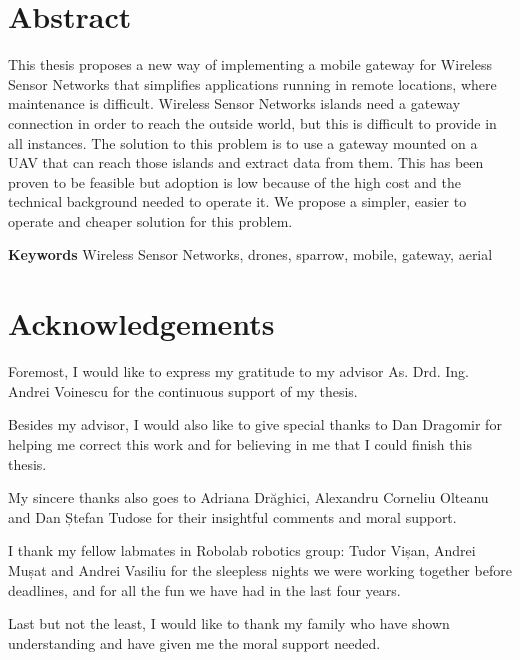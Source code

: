 \chapter*{Abstract}

This thesis proposes a new way of implementing a mobile gateway for Wireless Sensor Networks that simplifies applications running in remote locations, where maintenance is difficult. Wireless Sensor Networks islands need a gateway connection in order to reach the outside world, but this is difficult to provide in all instances.  The solution to this problem is to use a gateway mounted on a UAV that can reach those islands and extract data from them. This has been proven to be feasible but adoption is low because of the high cost and the technical background needed to operate it. We propose a simpler, easier to operate and cheaper solution for this problem.


 

\textbf{Keywords} Wireless Sensor Networks, drones, sparrow, mobile, gateway, aerial

\chapter*{Acknowledgements}

Foremost, I would like to express my gratitude to my advisor As. Drd. Ing. Andrei Voinescu for the continuous support of my thesis.

Besides my advisor, I would also like to give special thanks to Dan Dragomir for helping me correct this work and for believing in me that I could finish this thesis. 
  
My sincere thanks also goes to Adriana Drăghici, Alexandru Corneliu Olteanu and Dan Ștefan Tudose for their insightful comments  and moral support.

I thank my fellow labmates in Robolab robotics group: Tudor Vișan, Andrei Mușat and Andrei Vasiliu for the sleepless nights we were working together before deadlines, and for all the fun we have had in the last four years.

Last but not the least, I would like to thank my family who have shown understanding and have given me the moral support needed.


